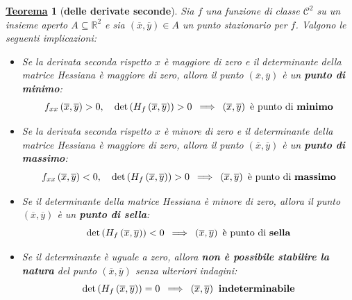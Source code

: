\documentclass[a4paper]{article}
\newtheorem{theorem}{\textcolor{Red3}{\underline{Teorema}}}
\begin{document}
	\begin{theorem}[\textbf{delle derivate seconde}]\label{theorem: delle derivate seconde}
		Sia $f$ una funzione di classe $\mathcal{C}^{2}$ su un insieme aperto $A \subseteq \mathbb{R}^{2}$ e sia $\left(\overline{x}, \overline{y}\right) \in A$ un punto stazionario per $f$. Valgono le seguenti implicazioni:
		\begin{itemize}
			\item Se la derivata seconda rispetto $x$ è maggiore di zero e il determinante della matrice Hessiana è maggiore di zero, allora il punto $\left(\overline{x},\overline{y}\right)$ è un \textbf{punto di minimo}:
			\begin{equation*}
				f_{xx}\left(\overline{x},\overline{y}\right) > 0, \hspace{1em} \det\left(H_{f}\left(\overline{x}, \overline{y}\right)\right) > 0 \hspace{.5em} \Longrightarrow \hspace{.5em} \left(\overline{x},\overline{y}\right) \text{ è punto di \textbf{minimo}}
			\end{equation*}
			
			\item Se la derivata seconda rispetto $x$ è minore di zero e il determinante della matrice Hessiana è maggiore di zero, allora il punto $\left(\overline{x},\overline{y}\right)$ è un \textbf{punto di massimo}:
			\begin{equation*}
				f_{xx}\left(\overline{x},\overline{y}\right) < 0, \hspace{1em} \det\left(H_{f}\left(\overline{x}, \overline{y}\right)\right) > 0 \hspace{.5em} \Longrightarrow \hspace{.5em} \left(\overline{x},\overline{y}\right) \text{ è punto di \textbf{massimo}}
			\end{equation*}

			\item Se il determinante della matrice Hessiana è minore di zero, allora il punto $\left(\overline{x},\overline{y}\right)$ è un \textbf{punto di sella}:
			\begin{equation*}
				\det\left(H_{f}\left(\overline{x}, \overline{y}\right)\right) < 0 \hspace{.5em} \Longrightarrow \hspace{.5em} \left(\overline{x},\overline{y}\right) \text{ è punto di \textbf{sella}}
			\end{equation*}

			\item Se il determinante è uguale a zero, allora \textbf{non è possibile stabilire la natura} del punto $\left(\overline{x}, \overline{y}\right)$ senza ulteriori indagini:
			\begin{equation*}
				\det\left(H_{f}\left(\overline{x}, \overline{y}\right)\right) = 0 \hspace{.5em} \Longrightarrow \hspace{.5em} \left(\overline{x},\overline{y}\right) \textbf{ indeterminabile}
			\end{equation*}
		\end{itemize}
	\end{theorem}
\end{document}
